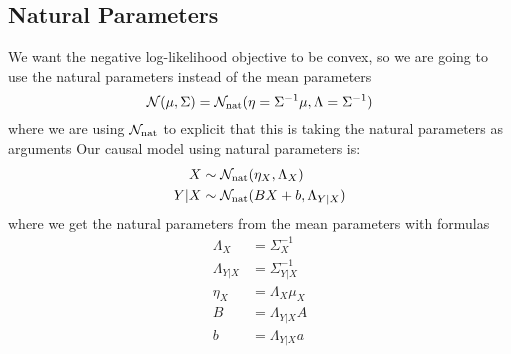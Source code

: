 \begin{subappendices}
\subsection{Natural Parameters}
We want the negative log-likelihood objective to be convex, so we are going to use the natural parameters instead of the mean parameters
\begin{equation}
    {\mathcal N}(\mu, \Sigma)
    = {\mathcal N}_\text{nat}(\eta = \Sigma^{-1}\mu,
        \Lambda = \Sigma^{-1})
\end{equation}
where we are using ${\mathcal N}_\text{nat}$ to explicit that this is taking the natural parameters as arguments
Our causal model using natural parameters is:
\begin{align}
\label{eq:normal_natural_model}
    X &\sim {\mathcal N}_\text{nat}(\eta_X, \Lambda_X) \\
    Y|X &\sim {\mathcal N}_\text{nat}(B X + b, \Lambda_{Y|X}) \nonumber
\end{align}
where we get the natural parameters from the mean parameters with formulas
\begin{align*}
    \Lambda_X &=\Sigma_X^{-1}\\
    \Lambda_{Y|X} &= \Sigma_{Y|X}^{-1}\\
    \eta_X &= \Lambda_X \mu_X\\
    B&= \Lambda_{Y|X} A\\
    b&= \Lambda_{Y|X} a
\end{align*}


\end{subappendices}
